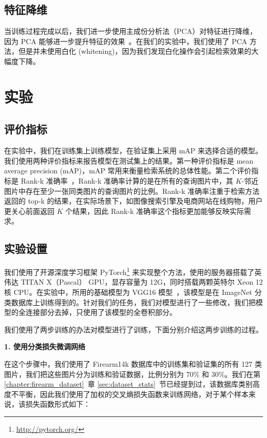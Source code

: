 \subsection{特征降维}
当训练过程完成以后，我们进一步使用主成份分析法（PCA）对特征进行降维，因为 PCA 能够进一步提升特征的效果~\cite{Radenovic2016CNNIR,Babenko2014NeuralCF,Tolias2015ParticularOR,Babenko2015AggregatingLD}。在我们的实验中，我们使用了 PCA 方法，但是并未使用白化 (whitening)，因为我们发现白化操作会引起检索效果的大幅度下降。

\section{实验}\label{sec:double_margin_exprt}

\subsection{评价指标}
在实验中，我们在训练集上训练模型，在验证集上采用 mAP 来选择合适的模型。我们使用两种评价指标来报告模型在测试集上的结果。第一种评价指标是 mean average precision (mAP)，mAP 常用来衡量检索系统的总体性能。第二个评价指标是 Rank-k 准确率~\cite{Jgou2011ProductQF,Song2016DeepML}，Rank-k 准确率计算的是在所有的查询图片中，其 $K$-邻近图片中存在至少一张同类图片的查询图片的比例。Rank-k 准确率注重于检索方法返回的 top-k 的结果，在实际场景下，如图像搜索引擎及电商网站在线购物，用户更关心前面返回 $K$ 个结果，因此 Rank-k 准确率这个指标更加能够反映实际需求。

\subsection{实验设置}
我们使用了开源深度学习框架 PyTorch\footnote{\url{http://pytorch.org/}} 来实现整个方法，使用的服务器搭载了英伟达 TITAN X（Pascal） GPU，显存容量为 12G，同时搭载两颗英特尔 Xeon 12 核 CPU。在实验中，所用的基础模型为 VGG16 模型~\cite{Simonyan2014VeryDC}，该模型是在 ImageNet 分类数据库上训练得到的。针对我们的任务，我们对模型进行了一些修改，我们把模型的全连接部分去掉，只使用了该模型的全卷积部分。

我们使用了两步训练的办法对模型进行了训练，下面分别介绍这两步训练的过程。

\noindent \textbf{1. 使用分类损失微调网络}

在这个步骤中，我们使用了 Firearm14k 数据库中的训练集和验证集的所有 127 类图片，我们把这些图片分为训练和验证数据，比例分别为 70\% 和 30\%。我们在第 \ref{chapter:firearm_dataset}~章 \ref{sec:dataset_stats}~节已经提到过，该数据库类别高度不平衡，因此我们使用了加权的交叉熵损失函数来训练网络，对于某个样本来说，该损失函数形式如下：

